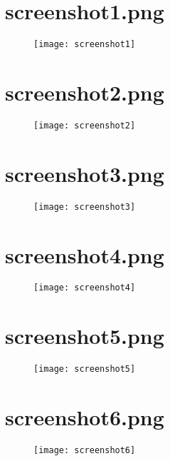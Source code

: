 \documentclass[a4paper,12pt]{report}
\begin{document}
		\chapter{screenshot1.png}
		\label{appendixC}
			\begin{figure}
				\begin{center}
				\texttt{[image: screenshot1]}
				\end{center}
			\end{figure}
		\chapter{screenshot2.png}
		\label{appendixD}
			\begin{figure}
				\begin{center}
				\texttt{[image: screenshot2]}
				\end{center}
			\end{figure}
		\chapter{screenshot3.png}
		\label{appendixE}
			\begin{figure}
				\begin{center}
				\texttt{[image: screenshot3]}
				\end{center}
			\end{figure}
		\chapter{screenshot4.png}
		\label{appendixF}
			\begin{figure}
				\begin{center}
				\texttt{[image: screenshot4]}
				\end{center}
			\end{figure}
		\chapter{screenshot5.png}
		\label{appendixG}
			\begin{figure}
				\begin{center}
				\texttt{[image: screenshot5]}
				\end{center}
			\end{figure}
		\chapter{screenshot6.png}
		\label{appendixH}
			\begin{figure}
				\begin{center}
				\texttt{[image: screenshot6]}
				\end{center}
			\end{figure}
\end{document}

